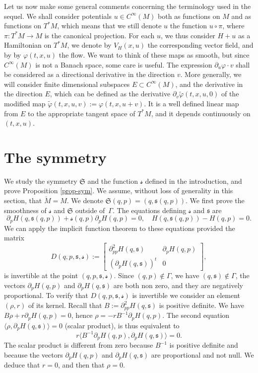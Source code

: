 \documentclass[JEP,XML,SOM,Unicode,published]{cedram}
\newcommand{\gs}{\ensuremath{\mathfrak{s}}}
\newcommand{\gS}{\ensuremath{\mathfrak{S}}}
\newcommand{\ms}{\ensuremath{\mathscr{s}}}
\theoremstyle{plain}
\theoremstyle{definition}
\begin{document}
Let us now make some general comments concerning the terminology used in the sequel.
We shall consider potentials $u\in C^{\infty}(M)$ both as functions on $M$ and as functions on $T^*M$, which means that we
still denote $u$ the function $u\circ \pi$, where $\pi:T^*M\to M$ is the canonical projection.
For each $u$, we thus consider $H+u$ as a Hamiltonian on $T^*M$, we denote by $V_H(x,u)$ the corresponding vector field, and by
by $\varphi(t,x,u)$ the flow. We want to think of these maps as smooth, but since $C^{\infty}(M)$ is not a Banach space, some care is useful. The expression $\partial_u \varphi \cdot v$ shall be considered as a directional
derivative in the direction $v$. More generally, we will consider finite dimensional subspaces $E\subset C^{\infty}(M)$,
and the derivative in the direction $E$, which can be defined as the derivative $\partial_v \tilde \varphi(t,x,u,0)$
of the modified map $\tilde \varphi(t,x,u,v):=\varphi(t,x,u+v)$. It is a well defined linear map from $E$ to the appropriate tangent space of $T^*M$, and it depends continuously on $(t,x,u)$.

\section{The symmetry}\label{sec-sym}

We study the symmetry $\gS$ and the function $\ms$ defined in the introduction, and prove Proposition \ref{prop-sym}.
We assume, without loss of generality in this section, that $\breve M=M$.
We denote $\gS(q,p)=(q,\gs(q,p))$.
We first prove the smoothness of $\ms$ and $\gS$ outside of~$\Gamma$. The equations defining $\ms$ and $\gs$ are
\[
\partial_pH (q, \gs(q,p))+\ms(q,p)\partial_pH(q,p)=0, \quad H(q,\gs(q,p))-H(q,p)=0.
\]
We can apply the implicit function theorem to these equations provided the matrix
\[
D(q,p,\gs,\ms):=\begin{bmatrix}
\partial^2_{pp}H(q, \gs) & \partial_pH(q, p)\\ (\partial_pH(q,\gs))^t& 0
\end{bmatrix},
\]
is invertible at the point $(q,p,\gs,\ms)$.
Since $(q,p)\not \in \Gamma$, we have $(q,\gs)\not \in \Gamma$, the vectors
$
\partial_pH(q,p)$
and
$\partial_pH(q,\gs)$
are both non zero, and they are negatively proportional.
To verify that $D(q,p,\gs, \ms)$ is invertible we consider an element
$(\rho, r)$ of its kernel. Recall that $B:= \partial^2_{pp}H(q,\gs)$ is positive definite.
We have $B\rho+r\partial_pH(q,p)=0$, hence $\rho=-rB^{-1}\partial_pH(q,p)$.
The second equation
$\langle \rho, \partial_p H(q,\gs)\rangle =0$ (scalar product),
is thus equivalent to
\[
r\langle B^{-1}\partial_pH(q,p), \partial_pH(q,\gs)\rangle =0.
\]
The scalar product is different from zero because $B^{-1}$ is positive definite and because the vectors $\partial_pH(q,p)$ and $\partial_pH(q,\gs)$ are proportional and not null. We deduce that $r=0$, and then that $\rho=0$.
\end{document}
